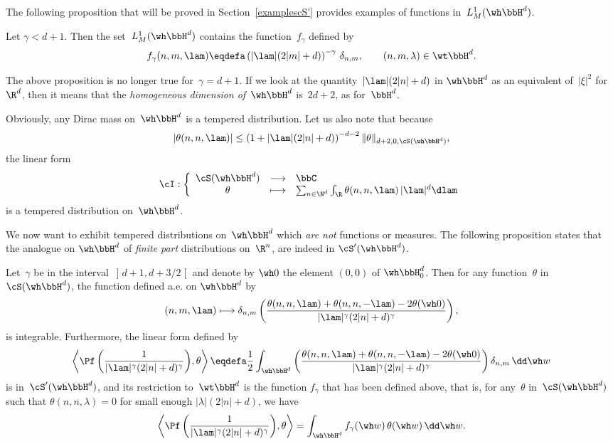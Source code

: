 The following proposition that will be proved in Section~\ref{examplescS'} provides examples of functions in~$L^1_M(\wh \bbH^d)$.

\begin{prop}\label{dimhomoconcretwhH}
Let $\gamma<d+1$. Then the set~$L^1_M(\wh \bbH^d)$ contains the function~$f_\gamma$ defined by
\[
f_\gamma(n,m,\lam) \eqdefa \left(|\lam| (2|m|+d)\right) ^{-\gamma} \, \delta_{n,m},\qquad (n,m,\lambda)\in\wt\bbH^d.
\]
\end{prop}

\begin{rema}
The above proposition is no longer true for~$\gamma=d+1$. If we look at the quantity~$|\lam| (2|n|+d)$ in $\wh\bbH^d$ as an equivalent of~$|\xi|^2$ for~$\R^d$, then it means that the \emph{homogeneous dimension of~$\wh \bbH^d$} is~$2d+2$, as for~$\bbH^d$.
\end{rema}

Obviously, any Dirac mass on~$\wh\bbH^d$ is a tempered distribution. Let us also note that because
\[
|\theta (n,n,\lam) | \leq \left(1+|\lam|(2 |n |+d)\right)^{-d-2} \|\theta\|_{d+2,0, \cS(\wh \bbH^d)},
\]
the linear form
\begin{equation}\label{IdentitydiscreteFourier}
\cI : \left\{
\begin{array}{ccl}
\cS(\wh\bbH^d) & \longrightarrow & \bbC\\
\theta & \longmapsto &\sum_{n\in \N^d} \int_{\R} \theta (n,n,\lam)\,|\lam|^d\dlam
\end{array}
\right.
\end{equation}
is a tempered distribution on~$\wh\bbH^d$.

We now want to exhibit tempered distributions on~$\wh \bbH^d$ which \emph{are not} functions or measures. The following proposition states that the analogue on $\wh\bbH^d$ of \emph{finite part} distributions on~$\R^n$, are indeed in $\cS'(\wh\bbH^d)$.

\begin{prop}\label{examplepartiefinie}
Let~$\gamma$ be in the interval~$\mathopen{]}d+1,d+3/2\mathclose{[}$ and denote by $\wh 0$ the element $(0,0)$ of $\wh\bbH^d_0$. Then for any function~$\theta$ in~$\cS(\wh\bbH^d)$, the function defined a.e. on $\wh\bbH^d$ by
\[
(n,m,\lam)\longmapsto \delta_{n,m}\left(\frac {\theta(n,n,\lam)+ \theta(n,n,-\lam) -2\theta(\wh 0) }{ |\lam|^\gamma (2|n|+d)^\gamma}\right),
\]
is integrable. Furthermore, the linear form defined by
\[
\left\langle \Pf \left(\frac 1 {|\lam|^\gamma(2|n|+d)^\gamma}\right)\!, \theta \right\rangle \eqdefa \frac 12 \int_{\wh \bbH^d}
\left(\frac {\theta(n,n,\lam)+ \theta(n,n,-\lam) -2\theta(\wh 0) }{ |\lam|^\gamma (2|n|+d)^\gamma} \right)\delta_{n,m} \,\dd\wh w
\]
is in~$\cS'(\wh\bbH^d)$, and its restriction to~$\wt\bbH^d$ is the function $f_\gamma$ that has been defined above, that is, for any~$\theta $ in~$\cS(\wh\bbH^d)$ such that $\theta(n,n,\lambda)=0$ for small enough $|\lambda|(2|n|+d)$, we have
\[
\left\langle \Pf\left(\frac 1 {|\lam|^\gamma(2|n|+d)^\gamma}\right)\!, \theta \right\rangle = \int_{\wh \bbH^d} f_\gamma(\wh w)\,{\theta (\wh w)} \, \dd\wh w.
\]
\end{prop}

